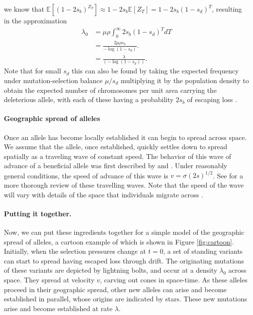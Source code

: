 \documentclass{article}
\newcommand{\E}{\mathbb{E}}
\begin{document}
we know that $\E[(1-2s_b)^{Z_T}] \approx 1-2s_b \E[Z_T] = 1-2s_b (1-s_d)^T$,
resulting in the approximation
\begin{align}
    \lambda_0 &= \mu \rho \int_0^\infty 2s_b (1-s_d)^{T} dT \\
        &= \frac{ 2 \mu \rho s_b }{ -\log(1-s_d) } .\\
        & =  \frac{\lambda }{ (-\log(1-s_d)) }.
\end{align}
Note that for small $s_d$ this can also be found by taking the expected frequency under mutation-selection
balance $\mu/s_d $ \citep{Haldane:27,Haldane:37} multiplying it by the
population density to obtain the expected number of chromosomes per unit area
carrying the deleterious allele, with each of these having a
probability $2s_b$ of escaping loss \citep[an analogous approach to
that taken by ][]{Orr:01}
. 

\paragraph{Geographic spread of alleles} 
Once an allele has become locally established it can begin to spread across space. 
We assume that the allele, once established, 
quickly settles down to spread spatially as a traveling wave of constant speed. 
The behavior of this wave of advance of a beneficial allele was first described by 
\citet{fisher1937wave} and \citet*{KPP1937}. 
Under reasonably general conditions, the speed of advance of this wave is $v = \sigma (2s)^{1/2}$. 
See \citet{ralphcoop2010} for a more thorough review of these travelling waves.
Note that the speed of the wave will vary
with details of the space that individuals migrate across
\citep[e.g.\ see ][ for comparisons to migration on discrete grids]{Slatkin-speed:76,SlatkinCharlesworth:78}.

\paragraph{Putting it together.}
Now, we can put these ingredients together for a simple model of the geographic spread of alleles, 
a cartoon example of which is shown in Figure \ref{fig:cartoon}. 
Initially, when the selection pressures change at $t=0$, 
a set of standing variants can start to spread having escaped loss through drift. 
The originating mutations of these variants are depicted by lightning bolts, and occur at a density $\lambda_0$ across space. 
They spread at velocity $v$, carving out cones in space-time. 
As these alleles proceed in their geographic spread, other new alleles can arise and become established in parallel, 
whose origins are indicated by stars.
These new mutations arise and become established at rate $\lambda$.
\end{document}
